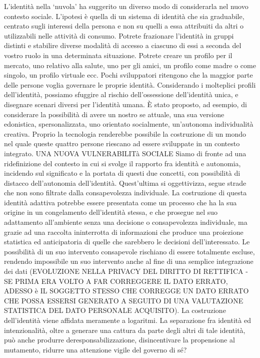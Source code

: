 L’identità nella ‘nuvola’ ha suggerito un diverso modo di considerarla nel nuovo contesto sociale. L’ipotesi è quella di un sistema di identità che sia graduabile, centrato sugli interessi della persona e non su quelli a essa attribuiti da altri o utilizzabili nelle attività di consumo. Potrete frazionare l’identità in gruppi distinti e stabilire diverse modalità di accesso a ciascuno di essi a seconda del vostro ruolo in una determinata situazione. Potrete creare un profilo per il mercato, uno relativo alla salute, uno per gli amici, un profilo come madre o come singolo, un profilo virtuale ecc. Pochi sviluppatori ritengono che la maggior parte delle persone voglia governare le proprie identità.
Considerando i molteplici profili dell’identità, possiamo sfuggire al rischio dell’ossessione dell’identità unica, e disegnare scenari diversi per l’identità umana. È stato proposto, ad esempio, di considerare la possibilità di avere un nostro se attuale, una sua versione edonistica, spersonalizzata, uno orientato socialmente, un’autonoma individualità creativa. Proprio la tecnologia renderebbe possibile la costruzione di un mondo nel quale queste quattro persone riescano ad essere sviluppate in un contesto integrato.
UNA NUOVA VULNERABILITà SOCIALE
Siamo di fronte ad una ridefinizione del contesto in cui si svolge il rapporto fra identità e autonomia, incidendo sul significato e la portata di questi due concetti, con possibilità di distacco dell’autonomia dell’identità. Quest’ultima si oggettivizza, segue strade che non sono filtrate dalla consapevolezza individuale. La costruzione di questa identità adattiva potrebbe essere presentata come un processo che ha la sua origine in un congelamento dell’identità stessa, e che prosegue nel suo adattamento all’ambiente senza una decisione o consapevolezza individuale, ma grazie ad una raccolta ininterrotta di informazioni che produce una proiezione statistica ed anticipatoria di quelle che sarebbero le decisioni dell’interessato. Le possibilità di un suo intervento consapevole rischiano di essere totalmente escluse, rendendo impossibile un suo intervento anche al fine di una semplice integrazione dei dati (EVOLUZIONE NELLA PRIVACY DEL DIRITTO DI RETTIFICA -  SE PRIMA ERA VOLTO A FAR CORREGGERE IL DATO ERRATO, ADESSO è IL SOGGETTO STESSO CHE CORREGGE UN DATO ERRATO CHE POSSA ESSERSI GENERATO A SEGUITO DI UNA VALUTAZIONE STATISTICA DEL DATO PERSONALE ACQUISITO). La costruzione dell’identità viene affidata meramente a logaritmi. La separazione fra identità ed intenzionalità, oltre a generare una cattura da parte degli altri di tale identità, può anche produrre deresponsabilizzazione, disincentivare la propensione al mutamento, ridurre una attenzione vigile del governo di sé?
